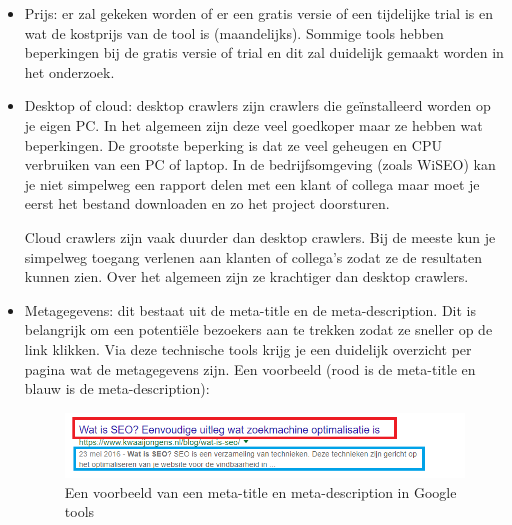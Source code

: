 \begin{itemize}
\item Prijs: er zal gekeken worden of er een gratis versie of een tijdelijke trial is en wat de kostprijs van de tool is (maandelijks). Sommige tools hebben beperkingen bij de gratis versie of trial en dit zal duidelijk gemaakt worden in het onderzoek. 
\item Desktop of cloud: 
desktop crawlers zijn crawlers die geïnstalleerd worden op je eigen PC. In het algemeen zijn deze veel goedkoper maar ze hebben wat beperkingen. De grootste beperking is dat ze veel geheugen en CPU verbruiken van een PC of laptop. In de bedrijfsomgeving (zoals WiSEO) kan je niet simpelweg een rapport delen met een klant of collega maar moet je eerst het bestand downloaden en zo het project doorsturen. 

Cloud crawlers zijn vaak duurder dan desktop crawlers. Bij de meeste kun je simpelweg toegang verlenen aan klanten of collega’s zodat ze de resultaten kunnen zien. Over het algemeen zijn ze krachtiger dan desktop crawlers. 

\item Metagegevens: dit bestaat uit de meta-title en de meta-description. Dit is belangrijk om een potentiële bezoekers aan te trekken zodat ze sneller op de link klikken. Via deze technische tools krijg je een duidelijk overzicht per pagina wat de metagegevens zijn. Een voorbeeld (rood is de meta-title en blauw is de meta-description):

\begin{figure}[h!]
\centering
\includegraphics[width=\linewidth]{img/metadescription.png}
\caption{Een voorbeeld van een meta-title en meta-description in Google tools
\autocite{google.be}}
\end{figure}


\end{itemize}
